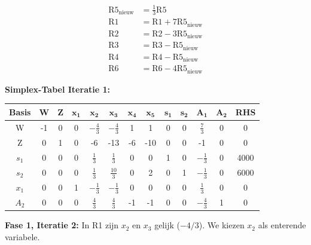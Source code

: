 \documentclass[a4paper,11pt]{article}
\begin{document}
\begin{oefenblok}
    \begin{align*}
        \text{R5}_{\text{nieuw}} & = \frac{1}{3}\text{R5} \\
        \text{R1} & = \text{R1} + 7\text{R5}_{\text{nieuw}} \\
        \text{R2} & = \text{R2} - 3\text{R5}_{\text{nieuw}} \\
        \text{R3} & = \text{R3} - \text{R5}_{\text{nieuw}} \\
        \text{R4} & = \text{R4} - \text{R5}_{\text{nieuw}} \\
        \text{R6} & = \text{R6} - 4\text{R5}_{\text{nieuw}}
    \end{align*}

    \textbf{Simplex-Tabel Iteratie 1:}

    \begin{center}
        \footnotesize
        \setlength{\tabcolsep}{3pt}
        \begin{tabular}{|c|c|c|c|c|c|c|c|c|c|c|c|c|}
            \hline
            \textbf{Basis} & \textbf{W} & \textbf{Z} & $\mathbf{x_1}$ & $\mathbf{x_2}$ & $\mathbf{x_3}$ & $\mathbf{x_4}$ & $\mathbf{x_5}$ & $\mathbf{s_1}$ & $\mathbf{s_2}$ & $\mathbf{A_1}$ & $\mathbf{A_2}$ & \textbf{RHS} \\
            \hline
            W & -1 & 0 & 0 & $-\frac{4}{3}$ & $-\frac{4}{3}$ & 1 & 1 & 0 & 0 & $\frac{7}{3}$ & 0 & 0 \\
            \hline
            Z & 0 & 1 & 0 & -6 & -13 & -6 & -10 & 0 & 0 & -1 & 0 & 0 \\
            \hline
            $s_1$ & 0 & 0 & 0 & $\frac{1}{3}$ & $\frac{1}{3}$ & 0 & 0 & 1 & 0 & $-\frac{1}{3}$ & 0 & 4000 \\
            \hline
            $s_2$ & 0 & 0 & 0 & $\frac{1}{3}$ & $\frac{10}{3}$ & 0 & 2 & 0 & 1 & $-\frac{1}{3}$ & 0 & 6000 \\
            \hline
            $x_1$ & 0 & 0 & 1 & $-\frac{1}{3}$ & $-\frac{1}{3}$ & 0 & 0 & 0 & 0 & $\frac{1}{3}$ & 0 & 0 \\
            \hline
            $A_2$ & 0 & 0 & 0 & $\frac{4}{3}$ & $\frac{4}{3}$ & -1 & -1 & 0 & 0 & $-\frac{4}{3}$ & 1 & 0 \\
            \hline
        \end{tabular}
    \end{center}

    \textbf{Fase 1, Iteratie 2:} In R1 zijn $x_2$ en $x_3$ gelijk ($-4/3$). We kiezen $x_2$ als enterende variabele.


\end{oefenblok}
\end{document}

